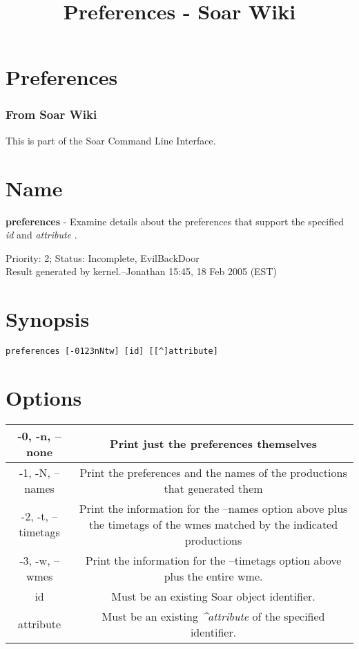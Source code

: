 \documentclass[10pt]{article}
\title{Preferences - Soar Wiki}
\begin{document}
\section*{Preferences}
\subsubsection*{From Soar Wiki}


 This is part of the Soar Command Line Interface. 
\section*{ Name }


 \textbf{preferences}
 - Examine details about the preferences that support the specified \emph{id}
 and \emph{attribute}
. 


 Priority: 2; Status: Incomplete, EvilBackDoor\\ 
Result generated by kernel.--Jonathan 15:45, 18 Feb 2005 (EST) 
\section*{ Synopsis }
\begin{verbatim}
preferences [-0123nNtw] [id] [[^]attribute]

\end{verbatim}
\section*{ Options }


\begin{tabular}{|c|c|}
\hline 
 -0, -n, --none  & Print just the preferences themselves  \\
 \hline 
 -1, -N, --names  & Print the preferences and the names of the productions that generated them  \\
 \hline 
 -2, -t, --timetags  & Print the information for the --names option above plus the timetags of the wmes matched by the indicated productions  \\
 \hline 
 -3, -w, --wmes  & Print the information for the --timetags option above plus the entire wme.  \\
 \hline 
id & Must be an existing Soar object identifier.  \\
 \hline 
attribute & Must be an existing \emph{\^{}attribute}
 of the specified identifier.  \\
 \hline 

\end{tabular}
\end{document}
